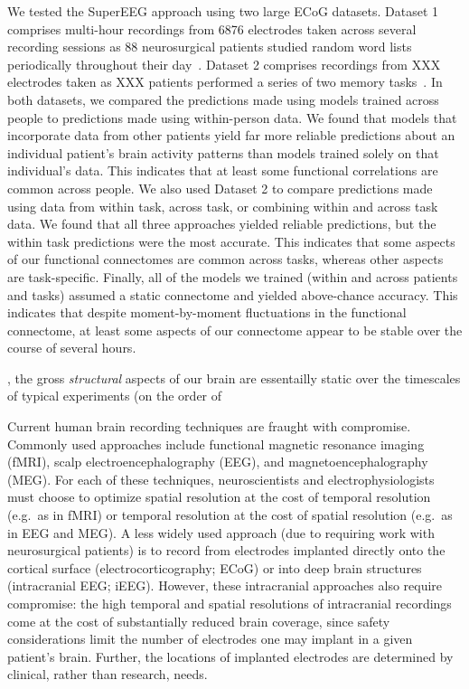 We tested the SuperEEG approach using two large ECoG datasets. Dataset 1 comprises multi-hour recordings from 6876 electrodes taken across several recording sessions as 88 neurosurgical patients studied random word lists periodically throughout their day~\cite{SedeEtal03, SedeEtal07a,
  SedeEtal07b, MannEtal11, MannEtal12}.  Dataset 2 comprises recordings from XXX electrodes taken as XXX patients performed a series of two memory tasks~\citep{EzzyEtal17, HoraEtal17, KragEtal17, KuceEtal17, LinEtal17, SoloEtal18, WeidEtal18, EzzyEtal18, KuceEtal18}.  In both datasets, 
  we compared the predictions made using models trained across people to predictions made using within-person data.  We found that models that incorporate data from other patients yield far more reliable predictions about an individual patient's brain activity patterns than models trained solely on that individual's data.  This indicates that at least some functional correlations are common across people.  We also used Dataset 2 to compare predictions made using data from within task, across task, or combining within and across task data.  We found that all three approaches yielded reliable predictions, but the within task predictions were the most accurate.  This indicates that some aspects of our functional connectomes are common across tasks, whereas other aspects are task-specific.  Finally, all of the models we trained (within and across patients and tasks) assumed a static connectome and yielded above-chance accuracy.  This indicates that despite moment-by-moment fluctuations in the functional connectome, at least some aspects of our connectome appear to be stable over the course of several hours.






, the gross \textit{structural} aspects of our brain are essentailly static over the timescales of typical experiments (on the order of 

Current human brain recording techniques are fraught with compromise.
Commonly used approaches include functional magnetic resonance imaging
(fMRI), scalp electroencephalography (EEG), and magnetoencephalography
(MEG).  For each of these techniques, neuroscientists
and electrophysiologists must choose to optimize spatial resolution
at the cost of temporal resolution (e.g.\ as in fMRI) or temporal
resolution at the cost of spatial resolution (e.g.\ as in EEG
and MEG).  A less widely used approach (due to requiring work with
neurosurgical patients) is to record from electrodes implanted
directly onto the cortical surface (electrocorticography; ECoG) or
into deep brain structures (intracranial EEG; iEEG).  However, these
intracranial approaches also require compromise: the high temporal and
spatial resolutions of intracranial recordings come at the cost of
substantially reduced brain coverage, since safety considerations
limit the number of electrodes one may implant in a given patient's
brain.  Further, the locations of implanted electrodes are determined by clinical,
rather than research, needs.

